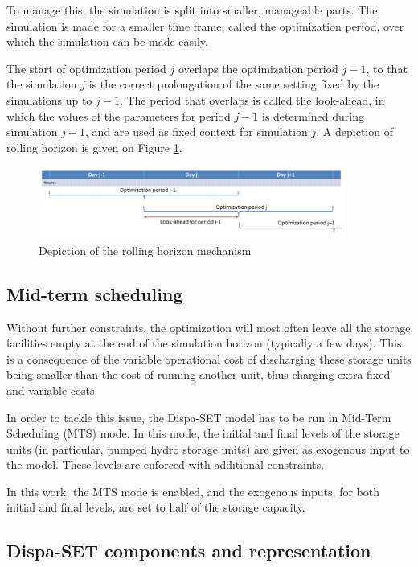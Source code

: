 To manage this, the simulation is split into smaller, manageable parts. The simulation is made for a smaller time frame, called the optimization period, over which the simulation can be made easily.

The start of optimization period $j$ overlaps the optimization period $j-1$, to that the simulation $j$ is the correct prolongation of the same setting fixed by the simulations up to $j-1$. The period that overlaps is called the look-ahead, in which the values of the parameters for period $j-1$ is determined during simulation $j-1$, and are used as fixed context for simulation $j$. A depiction of rolling horizon is given on Figure \ref{fig:rolling-horizon}.

\begin{figure}[h]
    \centering
    \includegraphics[width=0.9\textwidth]{resources/images/rolling_horizon.png}
    \caption{Depiction of the rolling horizon mechanism}
    \label{fig:rolling-horizon}
\end{figure}

\subsection{Mid-term scheduling}

Without further constraints, the optimization will most often leave all the storage facilities empty at the end of the simulation horizon (typically a few days). This is a consequence of the variable operational cost of discharging these storage units being smaller than the cost of running another unit, thus charging extra fixed and variable costs.

In order to tackle this issue, the Dispa-SET model has to be run in Mid-Term Scheduling (MTS) mode. In this mode, the initial and final levels of the storage units (in particular, pumped hydro storage units) are given as exogenous input to the model. These levels are enforced with additional constraints.

In this work, the MTS mode is enabled, and the exogenous inputs, for both initial and final levels, are set to half of the storage capacity.

\subsection{Dispa-SET components and representation}

